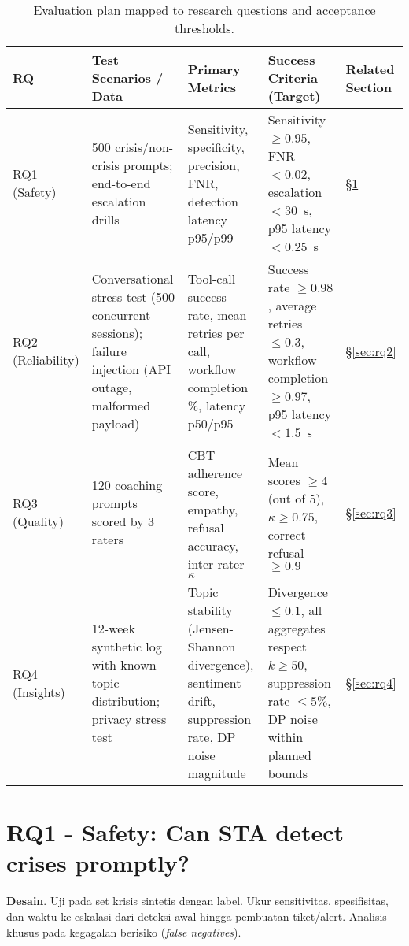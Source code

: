 \begin{table}[h]
    \centering
    \caption{Evaluation plan mapped to research questions and acceptance thresholds.}
    \label{tab:evaluation_plan}
    \begin{tabular}{p{1.9cm}p{3.2cm}p{3.4cm}p{3.2cm}p{2.3cm}}
        \toprule
        \textbf{RQ} & \textbf{Test Scenarios / Data} & \textbf{Primary Metrics} & \textbf{Success Criteria (Target)} & \textbf{Related Section} \\
        \midrule
        RQ1 (Safety) & 500 crisis/non-crisis prompts; end-to-end escalation drills & Sensitivity, specificity, precision, FNR, detection latency p95/p99 & Sensitivity $\geq 0.95$, FNR $< 0.02$, escalation $<30$~s, p95 latency $<0.25$~s & \S\ref{sec:rq1} \\
        RQ2 (Reliability) & Conversational stress test (500 concurrent sessions); failure injection (API outage, malformed payload) & Tool-call success rate, mean retries per call, workflow completion \%, latency p50/p95 & Success rate $\geq 0.98$, average retries $\leq 0.3$, workflow completion $\geq 0.97$, p95 latency $<1.5$~s & \S\ref{sec:rq2} \\
        RQ3 (Quality) & 120 coaching prompts scored by 3 raters & \multicolumn{1}{p{3.4cm}}{CBT adherence score, empathy, refusal accuracy, inter-rater $\kappa$} & Mean scores $\geq 4$ (out of 5), $\kappa \geq 0.75$, correct refusal $\geq 0.9$ & \S\ref{sec:rq3} \\
        RQ4 (Insights) & 12-week synthetic log with known topic distribution; privacy stress test & Topic stability (Jensen-Shannon divergence), sentiment drift, suppression rate, DP noise magnitude & Divergence $\leq 0.1$, all aggregates respect $k\geq 50$, suppression rate $\leq 5\%$, DP noise within planned bounds & \S\ref{sec:rq4} \\
        \bottomrule
    \end{tabular}
\end{table}

\section{RQ1 - Safety: Can STA detect crises promptly?}
\label{sec:rq1}

\textbf{Desain}. Uji pada set krisis sintetis dengan label. Ukur sensitivitas, spesifisitas, dan waktu ke eskalasi dari deteksi awal hingga pembuatan tiket/alert. Analisis khusus pada kegagalan berisiko (\textit{false negatives}).

